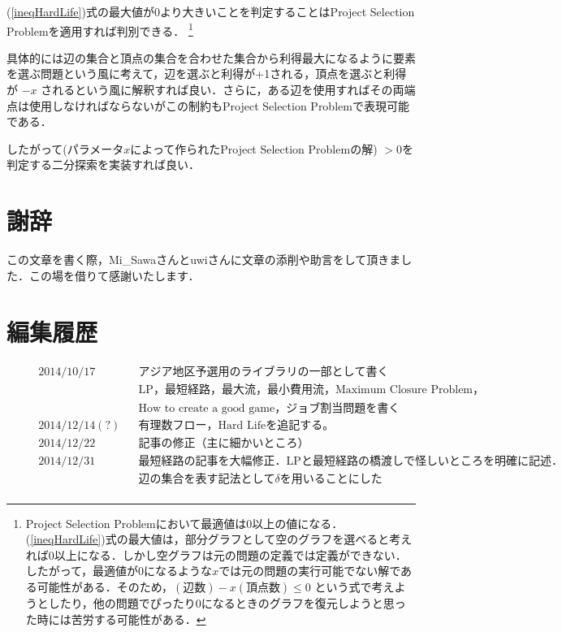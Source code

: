 \documentclass[13pt, a4paper, landscape]{jarticle}
\theoremstyle{nonitalic} %
\begin{document}
(\ref{ineqHardLife})式の最大値が0より大きいことを判定することはProject Selection Problemを適用すれば判別できる． \footnote{ Project Selection Problemにおいて最適値は0以上の値になる．(\ref{ineqHardLife})式の最大値は，部分グラフとして空のグラフを選べると考えれば0以上になる．しかし空グラフは元の問題の定義では定義ができない．したがって，最適値が0になるような$x$では元の問題の実行可能でない解である可能性がある．そのため，$ (\textrm{辺数}) - x (\textrm{頂点数}) \leq 0 $  という式で考えようとしたり，他の問題でぴったり$0$になるときのグラフを復元しようと思った時には苦労する可能性がある．}

具体的には辺の集合と頂点の集合を合わせた集合から利得最大になるように要素を選ぶ問題という風に考えて，辺を選ぶと利得が+1される，頂点を選ぶと利得が $-x$ されるという風に解釈すれば良い．さらに，ある辺を使用すればその両端点は使用しなければならないがこの制約もProject Selection Problemで表現可能である． 

したがって(パラメータ$x$によって作られたProject Selection Problemの解) $>0$を判定する二分探索を実装すれば良い． 





\section*{謝辞}
この文章を書く際，Mi\_Sawaさんとuwiさんに文章の添削や助言をして頂きました．この場を借りて感謝いたします．

\section*{編集履歴}
\begin{align*}
  &&& 2014/10/17 && アジア地区予選用のライブラリの一部として書く &&&\\
  &&&            && \mathrm{LP}， 最短経路， 最大流， 最小費用流， \textrm{Maximum Closure Problem}， \\
  &&&            &&\textrm{How to create a good game}， ジョブ割当問題を書く \\
  &&& 2014/12/14(?) && 有理数フロー， \textrm{Hard Life}を追記する。 \\
  &&& 2014/12/22    && 記事の修正（主に細かいところ）\\
  &&& 2014/12/31    && 最短経路の記事を大幅修正．\textrm{LP}と最短経路の橋渡しで怪しいところを明確に記述．\\
  &&&               && 辺の集合を表す記法として \delta を用いることにした\\
\end{align*}
\end{document}
